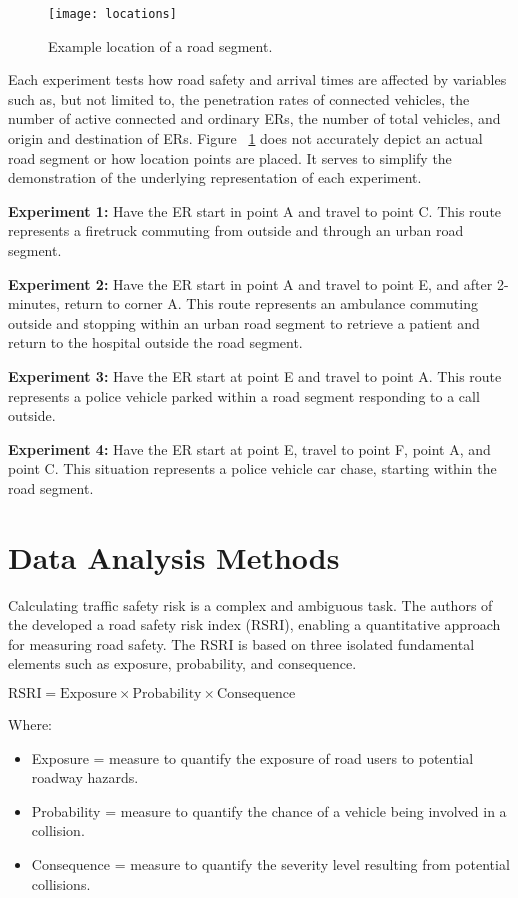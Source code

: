 	\begin{figure}
		\texttt{[image: locations]}
		\caption{Example location of a road segment.}
		\label{fig:locations}
	\end{figure}

	Each experiment tests how road safety and arrival times are affected by variables such as, but not limited to, the penetration rates of connected vehicles, the number of active connected and ordinary ERs, the number of total vehicles, and origin and destination of ERs. Figure ~\ref{fig:locations} does not accurately depict an actual road segment or how location points are placed. It serves to simplify the demonstration of the underlying representation of each experiment.
	
	\textbf{Experiment 1:}
	Have the ER start in point A and travel to point C.
	This route represents a firetruck commuting from outside and through an urban road segment.
	
	\textbf{Experiment 2:}
	Have the ER start in point A and travel to point E, and after 2-minutes, return to corner A.
	This route represents an ambulance commuting outside and stopping within an urban road segment to retrieve a patient and return to the hospital outside the road segment.
	
	\textbf{Experiment 3:}
	Have the ER start at point E and travel to point A.
	This route represents a police vehicle parked within a road segment responding to a call outside. 
	
	\textbf{Experiment 4:}
	Have the ER start at point E, travel to point F, point A, and point C. 
	This situation represents a police vehicle car chase, starting within the road segment.


\section{Data Analysis Methods}
	Calculating traffic safety risk is a complex and ambiguous task. The authors of the \cite{leur_sayed_2002} developed a road safety risk index (RSRI), enabling a quantitative approach for measuring road safety. The RSRI is based on three isolated fundamental elements such as exposure, probability, and consequence.
	
	\( \text{RSRI} = \text{Exposure} \times \text{Probability} \times \text{Consequence} \)
	
	Where:
	\begin{itemize}
		\item Exposure = measure to quantify the exposure of road users to potential roadway hazards.
		\item Probability = measure to quantify the chance of a vehicle being involved in a collision.
		\item Consequence = measure to quantify the severity level resulting from potential collisions.
	\end{itemize}

